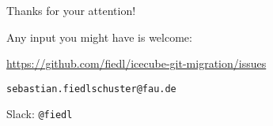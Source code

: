 
\begin{frame}{Thanks for your attention!}
  \begin{center}
    Any input you might have is welcome: \\ \vspace{0.3cm}

    \url{https://github.com/fiedl/icecube-git-migration/issues} \\ \vspace{0.2cm}

    \texttt{sebastian.fiedlschuster@fau.de}

    Slack: \texttt{@fiedl}

    \vspace{1.5cm}

  \end{center}
\end{frame}
